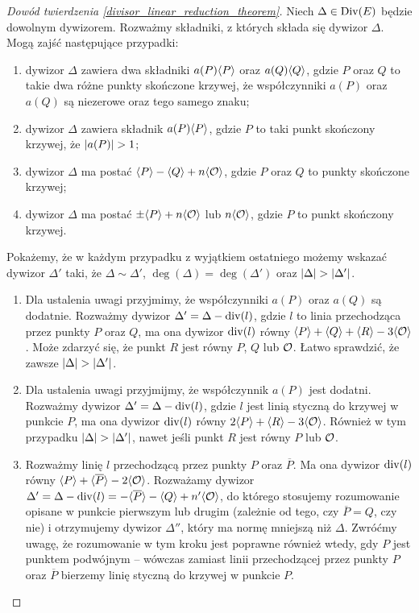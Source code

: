 \begin{proof}[Dowód twierdzenia \ref{divisor_linear_reduction_theorem}]
Niech $\Delta \in \operatorname{Div}(E)$ będzie dowolnym dywizorem.
Rozważmy składniki, z których składa się dywizor $\Delta$.
Mogą zajść następujące przypadki:
\begin{enumerate}
\item dywizor $\Delta$ zawiera dwa składniki
$a(P)\langle P\rangle$ oraz $a(Q)\langle Q\rangle$,
gdzie $P$ oraz $Q$ to takie dwa różne punkty skończone krzywej,
że współczynniki $a(P)$ oraz $a(Q)$ są niezerowe oraz tego samego znaku;
\item dywizor $\Delta$ zawiera składnik $a(P)\langle P\rangle$,
gdzie $P$ to taki punkt skończony krzywej, że $\lvert a(P)\rvert > 1$;
\item dywizor $\Delta$ ma postać $\langle P\rangle - \langle Q\rangle + n\langle\mathcal{O}\rangle$,
gdzie $P$ oraz $Q$ to punkty skończone krzywej;
\item dywizor $\Delta$ ma postać $\pm\langle P\rangle + n\langle\mathcal{O}\rangle$
lub $n\langle\mathcal{O}\rangle$,
gdzie $P$ to punkt skończony krzywej.
\end{enumerate}

Pokażemy, że w każdym przypadku z wyjątkiem ostatniego
możemy wskazać dywizor $\Delta'$ taki,
że $\Delta \sim \Delta'$, $\deg(\Delta) = \deg(\Delta')$
oraz $\lvert\Delta\rvert > \lvert\Delta'\rvert$.
\begin{enumerate}
\item Dla ustalenia uwagi przyjmimy,
że współczynniki $a(P)$ oraz $a(Q)$ są dodatnie.
Rozważmy dywizor $\Delta' = \Delta - \operatorname{div}(l)$,
gdzie $l$ to linia przechodząca przez punkty $P$ oraz $Q$,
ma ona dywizor $\operatorname{div}(l)$ równy
$\langle P\rangle + \langle Q\rangle + \langle R\rangle - 3\langle\mathcal{O}\rangle$.
Może zdarzyć się, że punkt $R$ jest równy $P$, $Q$ lub $\mathcal{O}$.
Łatwo sprawdzić, że zawsze $\lvert\Delta\rvert > \lvert\Delta'\rvert$.
\item Dla ustalenia uwagi przyjmijmy, że współczynnik $a(P)$ jest dodatni.
Rozważmy dywizor $\Delta' = \Delta - \operatorname{div}(l)$,
gdzie $l$ jest linią styczną do krzywej w punkcie $P$,
ma ona dywizor $\operatorname{div}(l)$ równy $2\langle P\rangle + \langle R\rangle - 3\langle\mathcal{O}\rangle$.
Również w tym przypadku $\lvert\Delta\rvert > \lvert\Delta'\rvert$,
nawet jeśli punkt $R$ jest równy $P$ lub $\mathcal{O}$.
\item Rozważmy linię $l$ przechodzącą przez punkty $P$ oraz $\overline{P}$.
Ma ona dywizor $\operatorname{div}(l)$ równy
$\langle P\rangle + \langle\overline{P}\rangle - 2\langle\mathcal{O}\rangle$.
Rozważamy dywizor
$\Delta' =
\Delta - \operatorname{div}(l) =
-\langle\overline{P}\rangle - \langle Q\rangle + n'\langle\mathcal{O}\rangle$,
do którego stosujemy rozumowanie opisane w punkcie pierwszym lub drugim
(zależnie od tego, czy $\overline{P} = Q$, czy nie)
i otrzymujemy dywizor $\Delta''$, który ma normę mniejszą niż $\Delta$.
Zwróćmy uwagę, że rozumowanie w tym kroku jest poprawne również wtedy,
gdy $P$ jest punktem podwójnym --
wówczas zamiast linii przechodzącej przez punkty $P$ oraz $\overline{P}$
bierzemy linię styczną do krzywej w punkcie $P$.
\end{enumerate}


\end{proof}
